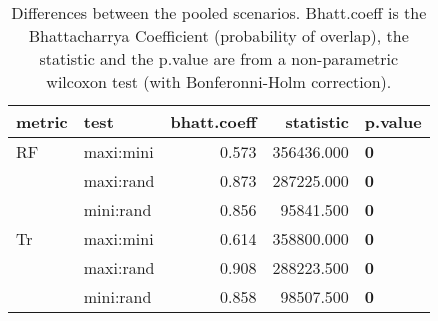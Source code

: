 \begin{table}[ht]
\centering
\begin{tabular}{llr|rl}
  \hline
metric & test & bhatt.coeff & statistic & p.value \\ 
  \hline
RF & maxi:mini & 0.573 & 356436.000 & \textbf{0} \\ 
   & maxi:rand & 0.873 & 287225.000 & \textbf{0} \\ 
   & mini:rand & 0.856 & 95841.500 & \textbf{0} \\ 
  Tr & maxi:mini & 0.614 & 358800.000 & \textbf{0} \\ 
   & maxi:rand & 0.908 & 288223.500 & \textbf{0} \\ 
   & mini:rand & 0.858 & 98507.500 & \textbf{0} \\ 
   \hline
\end{tabular}
\caption{Differences between the pooled scenarios. Bhatt.coeff is the Bhattacharrya Coefficient (probability of overlap), the statistic and the p.value are from a non-parametric wilcoxon test (with Bonferonni-Holm correction).} 
\label{Tab_pooledscenarios_test}
\end{table}
